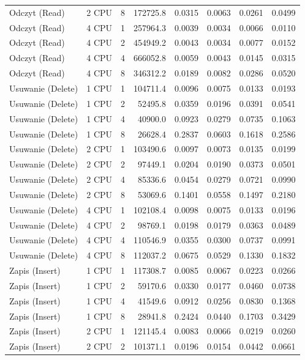 \begin{table}[ht]
{\begin{tabular}{llcrrrrr}
Odczyt (Read) & 2 CPU & 8 & 172725.8 & 0.0315 & 0.0063 & 0.0261 & 0.0499 \\
Odczyt (Read) & 4 CPU & 1 & 257964.3 & 0.0039 & 0.0034 & 0.0066 & 0.0110 \\
Odczyt (Read) & 4 CPU & 2 & 454949.2 & 0.0043 & 0.0034 & 0.0077 & 0.0152 \\
Odczyt (Read) & 4 CPU & 4 & 666052.8 & 0.0059 & 0.0043 & 0.0145 & 0.0315 \\
Odczyt (Read) & 4 CPU & 8 & 346312.2 & 0.0189 & 0.0082 & 0.0286 & 0.0520 \\
Usuwanie (Delete) & 1 CPU & 1 & 104711.4 & 0.0096 & 0.0075 & 0.0133 & 0.0193 \\
Usuwanie (Delete) & 1 CPU & 2 & 52495.8 & 0.0359 & 0.0196 & 0.0391 & 0.0541 \\
Usuwanie (Delete) & 1 CPU & 4 & 40900.0 & 0.0923 & 0.0279 & 0.0735 & 0.1063 \\
Usuwanie (Delete) & 1 CPU & 8 & 26628.4 & 0.2837 & 0.0603 & 0.1618 & 0.2586 \\
Usuwanie (Delete) & 2 CPU & 1 & 103490.6 & 0.0097 & 0.0073 & 0.0135 & 0.0199 \\
Usuwanie (Delete) & 2 CPU & 2 & 97449.1 & 0.0204 & 0.0190 & 0.0373 & 0.0501 \\
Usuwanie (Delete) & 2 CPU & 4 & 85336.6 & 0.0454 & 0.0279 & 0.0721 & 0.0990 \\
Usuwanie (Delete) & 2 CPU & 8 & 53069.6 & 0.1401 & 0.0558 & 0.1497 & 0.2180 \\
Usuwanie (Delete) & 4 CPU & 1 & 102108.4 & 0.0098 & 0.0075 & 0.0133 & 0.0196 \\
Usuwanie (Delete) & 4 CPU & 2 & 98769.1 & 0.0198 & 0.0179 & 0.0363 & 0.0489 \\
Usuwanie (Delete) & 4 CPU & 4 & 110546.9 & 0.0355 & 0.0300 & 0.0737 & 0.0991 \\
Usuwanie (Delete) & 4 CPU & 8 & 112037.2 & 0.0675 & 0.0529 & 0.1330 & 0.1832 \\
Zapis (Insert) & 1 CPU & 1 & 117308.7 & 0.0085 & 0.0067 & 0.0223 & 0.0266 \\
Zapis (Insert) & 1 CPU & 2 & 59170.6 & 0.0330 & 0.0177 & 0.0460 & 0.0738 \\
Zapis (Insert) & 1 CPU & 4 & 41549.6 & 0.0912 & 0.0256 & 0.0830 & 0.1368 \\
Zapis (Insert) & 1 CPU & 8 & 28941.8 & 0.2424 & 0.0440 & 0.1703 & 0.3429 \\
Zapis (Insert) & 2 CPU & 1 & 121145.4 & 0.0083 & 0.0066 & 0.0219 & 0.0260 \\
Zapis (Insert) & 2 CPU & 2 & 101371.1 & 0.0196 & 0.0154 & 0.0442 & 0.0661 \\

\end{tabular}}
\end{table}
